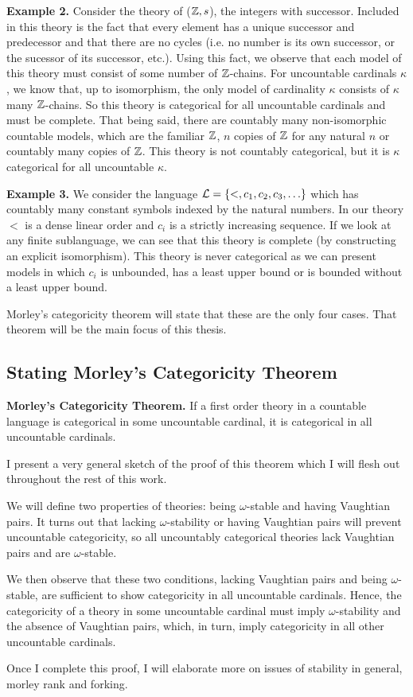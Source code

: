 \textbf{Example 2.} Consider the theory of (\(\mathbb{Z}, s\)), the integers with successor. 
Included in this theory is the fact that every element has a unique successor and predecessor and that there are no cycles (i.e. no number is its own successor, or the sucessor of its successor, etc.). 
Using this fact, we observe that each model of this theory must consist of some number of \(\mathbb{Z}\)-chains. 
For uncountable cardinals \(\kappa\), we know that, up to isomorphism, the only model of cardinality \(\kappa\) consists of \(\kappa\) many \(\mathbb{Z}\)-chains. 
So this theory is categorical for all uncountable cardinals and must be complete. 
That being said, there are countably many non-isomorphic countable models, which are the familiar \(\mathbb{Z}\), \(n\) copies of \(\mathbb{Z}\) for any natural \(n\) or countably many copies of \(\mathbb{Z}\). 
This theory is not countably categorical, but it is \(\kappa\) categorical for all uncountable \(\kappa\). 

\textbf{Example 3.} We consider the language \(\mathcal{L} = \{<, c_1, c_2, c_3, \ldots\}\) which has countably many constant symbols indexed by the natural numbers. 
In our theory \(<\) is a dense linear order and \(c_i\) is a strictly increasing sequence. 
If we look at any finite sublanguage, we can see that this theory is complete (by constructing an explicit isomorphism). %
This theory is never categorical as we can present models in which \(c_i\) is unbounded, has a least upper bound or is bounded without a least upper bound. 

Morley's categoricity theorem will state that these are the only four cases. 
That theorem will be the main focus of this thesis. 

\subsection{Stating Morley's Categoricity Theorem}

\textbf{Morley's Categoricity Theorem.} If a first order theory in a countable language is categorical in some uncountable cardinal, it is categorical in all uncountable cardinals. 

I present a very general sketch of the proof of this theorem which I will flesh out throughout the rest of this work. 

We will define two properties of theories: being \(\omega\)-stable and having Vaughtian pairs. 
It turns out that lacking \(\omega\)-stability or having Vaughtian pairs will prevent uncountable categoricity, so all uncountably categorical theories lack Vaughtian pairs and are \(\omega\)-stable. 

We then observe that these two conditions, lacking Vaughtian pairs and being \(\omega\)-stable, are sufficient to show categoricity in all uncountable cardinals. 
Hence, the categoricity of a theory in some uncountable cardinal must imply \(\omega\)-stability and the absence of Vaughtian pairs, which, in turn, imply categoricity in all other uncountable cardinals.

Once I complete this proof, I will elaborate more on issues of stability in general, morley rank and forking.  

